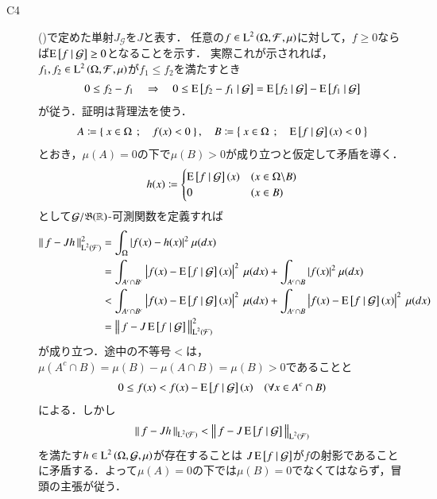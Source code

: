 \begin{prf}
\begin{description}
			\item[C4] ()で定めた単射$J_{\mathcal{G}}$を$J$と表す．
				任意の$f \in \operatorname{L}^{2} \left(\Omega, \mathcal{F},\mu\right)$に対して，$f \geq 0$ならば$\operatorname{E} \left[ f \ \middle|\ \mathcal{G} \right] \geq 0$となることを示す．
				実際これが示されれば，$f_1,f_2 \in \operatorname{L}^{2} \left(\Omega, \mathcal{F},\mu\right)$が$f_1 \leq f_2$を満たすとき
				\begin{align}
					0 \leq f_2 - f_1 \quad \Rightarrow \quad 0 \leq \operatorname{E} \left[ f_2 - f_1 \ \middle|\ \mathcal{G} \right] = \operatorname{E} \left[ f_2 \ \middle|\ \mathcal{G} \right] - \operatorname{E} \left[ f_1 \ \middle|\ \mathcal{G} \right]
				\end{align}
				が従う．証明は背理法を使う．
				\begin{align}
					A \coloneqq \left\{\ x \in \Omega\ \, ; \quad f(x) < 0\ \right\}, \quad
					B \coloneqq \left\{\ x \in \Omega\ \, ; \quad \operatorname{E} \left[ f \ \middle|\ \mathcal{G} \right](x) < 0\ \right\}
				\end{align}
				とおき，$\mu(A)=0$の下で$\mu(B) > 0$が成り立つと仮定して矛盾を導く．
				\begin{align}
					h(x) \coloneqq
					\begin{cases}
						\operatorname{E} \left[ f \ \middle|\ \mathcal{G} \right](x) & (x \in \Omega \backslash B) \\
						0 & (x \in B)
					\end{cases}
				\end{align}
				として$\mathcal{G}/\mathfrak{B}(\mathbb{R})$-可測関数を定義すれば
				\begin{align}
					\Norm{f - Jh}{\Lp{2}{\mathcal{F}}}^2 
					&= \int_{\Omega} |f(x) - h(x)|^2\ \mu(dx) \\
					&= \int_{A^c \cap B^c} \left|f(x) - \cexp{f}{\mathcal{G}}(x)\right|^2\ \mu(dx) + \int_{A^c \cap B} |f(x)|^2\ \mu(dx) \\
					&< \int_{A^c \cap B^c} \left|f(x) - \cexp{f}{\mathcal{G}}(x)\right|^2\ \mu(dx) + \int_{A^c \cap B} \left|f(x) - \cexp{f}{\mathcal{G}}(x)\right|^2\ \mu(dx) \\
					&= \Norm{f - J\cexp{f}{\mathcal{G}}}{\Lp{2}{\mathcal{F}}}^2
				\end{align}
				が成り立つ．途中の不等号$<$は，$\mu(A^c \cap B) = \mu(B) - \mu(A \cap B) = \mu(B) > 0$であることと
				\begin{align}
					0 \leq f(x) < f(x) - \operatorname{E} \left[ f \ \middle|\ \mathcal{G} \right](x) \quad (\forall x \in A^c \cap B)
				\end{align}
				による．しかし
				\begin{align}
					\left\|\, f - Jh\, \right\|_{\operatorname{L}^{2} \left(\mathcal{F}\right)} < \left\|\, f - J\operatorname{E} \left[ f \ \middle|\ \mathcal{G} \right]\, \right\|_{\operatorname{L}^{2} \left(\mathcal{F}\right)}
				\end{align}
				を満たす$h \in \operatorname{L}^{2} \left(\Omega, \mathcal{G},\mu\right)$が存在することは
				$J\operatorname{E} \left[ f \ \middle|\ \mathcal{G} \right]$が$f$の射影であることに矛盾する．よって$\mu(A) = 0$の下では$\mu(B) = 0$でなくてはならず，冒頭の主張が従う．
			

\end{description}
\end{prf}
